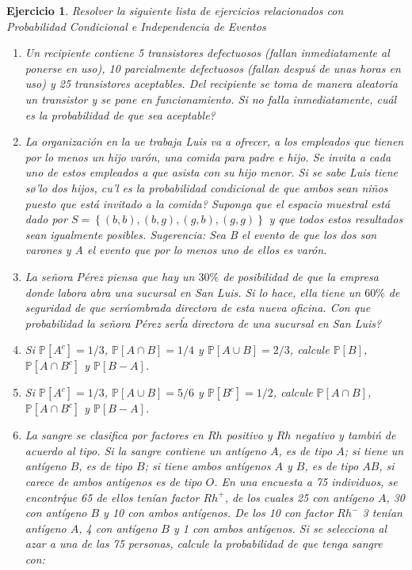 \documentclass[12pt,twoside]{article}
\newtheorem{Ejer}{Ejercicio}
\newcommand{\Prob}{\mathbb{P}}
\begin{document}
\begin{Ejer} Resolver la siguiente lista de ejercicios relacionados con Probabilidad Condicional e Independencia de Eventos
\begin{enumerate}


\item Un recipiente contiene 5 transistores defectuosos (fallan inmediatamente al ponerse en uso), 10 parcialmente defectuosos (fallan despu\'s de unas horas en uso) y 25 transistores aceptables. Del recipiente se toma de manera aleatoria un transistor y se pone en funcionamiento. Si no falla inmediatamente,  cu\'al es la probabilidad de que sea aceptable?


\item La organizaci\'on en la ue trabaja Luis va a ofrecer, a los empleados que tienen por lo menos un hijo var\'on, una comida para padre e hijo. Se invita a cada uno de estos empleados a que asista con su hijo menor. Si se sabe Luis tiene s\o'lo dos hijos,  cu\a'l es la probabilidad condicional de que ambos sean ni\~nos puesto que est\'a invitado a la comida? Suponga que el espacio muestral est\'a dado por $S=\left\{\left(b,b\right),\left(b,g\right),\left(g,b\right),\left(g,g\right)\right\}$ y que todos estos resultados sean igualmente posibles. Sugerencia: Sea B el evento de que los dos son varones y A el evento que por lo menos uno de ellos es var\'on.

\item La se\~nora P\'erez piensa que hay un $30\%$ de posibilidad de que la empresa donde labora abra una sucursal en San Luis. Si lo hace, ella tiene un $60\%$ de seguridad de que ser\' nombrada directora de esta nueva oficina.  Con que probabilidad la se\~nora P\'erez ser\' la directora de una sucursal en San Luis?



\item Si $\Prob\left[A^{c}\right]=1/3$, $\Prob\left[A\cap B\right]=1/4$ y $\Prob\left[A\cup B\right]=2/3$, calcule $\Prob\left[B\right]$, $\Prob\left[A\cap B^{c}\right]$ y $\Prob\left[B-A\right]$.

\item Si $\Prob\left[A^{c}\right]=1/3$, $\Prob\left[A\cup B\right]=5/6$ y $\Prob\left[B^{c}\right]=1/2$, calcule $\Prob\left[A\cap B\right]$, $\Prob\left[A\cap B^{c}\right]$ y $\Prob\left[B-A\right]$.

\item La sangre se clasifica por factores en $Rh$ positivo y $Rh$ negativo y tambi\'n de acuerdo al tipo. Si la sangre contiene un ant\'igeno $A$, es de tipo $A$; si tiene un ant\'igeno $B$, es de tipo $B$; si tiene ambos ant\'igenos $A$ y $B$, es de tipo $AB$, si carece de ambos ant\'igenos es de tipo $O$. En una encuesta a 75 individuos, se encontr\' que 65 de ellos ten\'ian factor $Rh^{+}$, de los cuales 25 con ant\'igeno $A$, 30 con ant\'igeno $B$ y 10 con ambos ant\'igenos. De los 10 con factor $Rh^{-}$ 3 ten\'ian ant\'igeno $A$, 4 con ant\'igeno $B$ y 1 con ambos ant\'igenos. Si se selecciona al azar a una de las 75 personas, calcule la probabilidad de que tenga sangre con:


\end{enumerate}
\end{Ejer}
\end{document}
